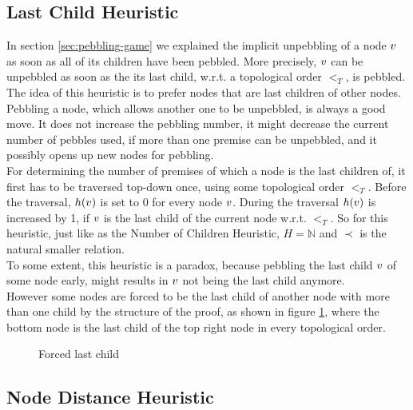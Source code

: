 \documentclass{llncs}
\begin{document}
\subsection{Last Child Heuristic}

In section \ref{sec:pebbling-game} we explained the implicit unpebbling of a node $v$ as soon as all of its children have been pebbled.
More precisely, $v$ can be unpebbled as soon as the its last child, w.r.t. a topological order $<_T$, is pebbled. 
The idea of this heuristic is to prefer nodes that are last children of other nodes.\\
Pebbling a node, which allows another one to be unpebbled, is always a good move. 
It does not increase the pebbling number, it might decrease the current number of pebbles used, if more than one premise can be unpebbled, and it possibly opens up new nodes for pebbling.\\
For determining the number of premises of which a node is the last children of, it first has to be traversed top-down once, using some topological order $<_T$.
Before the traversal, $h(v)$ is set to 0 for every node $v$. During the traversal $h(v)$ is increased by 1, if $v$ is the last child of the current node w.r.t. $<_T$.
So for this heuristic, just like as the Number of Children Heuristic, $H = \mathbb{N}$ and $\prec$ is the natural smaller relation.\\
To some extent, this heuristic is a paradox, because pebbling the last child $v$ of some node early, might results in $v$ not being the last child anymore.\\
However some nodes are forced to be the last child of another node with more than one child by the structure of the proof, as shown in figure \ref{fig:forcedLC}, where the bottom node is the last child of the top right node in every topological order.

\begin{figure}[h]
	\caption{Forced last child}
	\label{fig:forcedLC}
\end{figure}
\subsection{Node Distance Heuristic}
\end{document}

